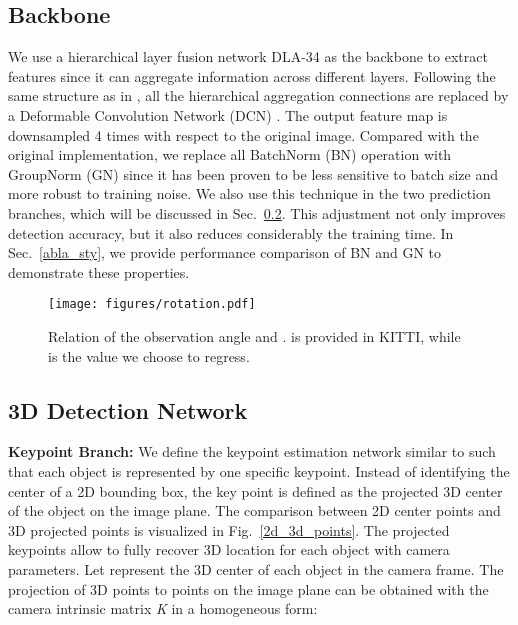 \documentclass[10pt,twocolumn,letterpaper]{article}
\renewcommand{\paragraph}[1]{

        \vspace{3pt}
	\noindent\textbf{#1}}
\begin{document}
\subsection{Backbone}
    We use a hierarchical layer fusion network DLA-34 \cite{dla_2018} as the backbone to extract features since it can aggregate information across different layers. Following the same structure as in \cite{centernet_2019}, all the hierarchical aggregation connections are replaced by a Deformable Convolution Network (DCN) \cite{dcn_2019}. The output feature map is downsampled 4 times with respect to the original image. Compared with the original implementation, we replace all BatchNorm (BN) \cite{bn_2015} operation with GroupNorm (GN) \cite{gn_2018} since it has been proven to be less sensitive to batch size and more robust to training noise.  We also use this technique in the two prediction branches, which will be discussed in Sec.~\ref{3d_net}. This adjustment not only improves detection accuracy, but it also reduces considerably the training time. In Sec.~\ref{abla_sty}, we provide performance comparison of BN and GN to demonstrate these properties.
    
    \begin{figure}
    \centering
    \vspace{-2em}
    \texttt{[image: figures/rotation.pdf]}
    \caption{Relation of the observation angle  and .  is provided in KITTI, while  is the value we choose to regress.} \vspace{-3mm}
    \label{rotation_difference}
    \end{figure}
    
\subsection{3D Detection Network}
\label{3d_net}
    \paragraph{Keypoint Branch:} 
    We define the keypoint estimation network similar to \cite{centernet_2019} such that each object is represented by one specific keypoint. Instead of identifying the center of a 2D bounding box, the key point is defined as the projected 3D center of the object on the image plane. The comparison between 2D center points and 3D projected points is visualized in Fig.~\ref{2d_3d_points}. The projected keypoints allow to fully recover 3D location for each object with camera parameters. Let  represent the 3D center of each object in the camera frame. The projection of 3D points to points  on the image plane can be obtained with the camera intrinsic matrix \textit{K} in a homogeneous form:
\end{document}

